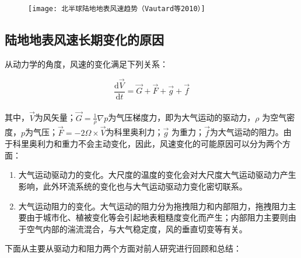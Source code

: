 \begin{figure}[!htbp]
    \centering
    \texttt{[image: 北半球陆地地表风速趋势（Vautard等2010）]}
    \label{fig:NHwindtrendVautard2010}
\end{figure}

\subsection{陆地地表风速长期变化的原因}

从动力学的角度，风速的变化满足下列关系：

\begin{equation} \label{eq:winddynmaic}
\frac{\mathrm{d} \vec{V}}{\mathrm{d} t} = \vec{G} + \vec{F} + \vec{g} + \vec{f}
\end{equation} ~\\
其中，$\vec{V}$为风矢量；$\vec{G} =\frac{1}{\rho} \nabla p $为气压梯度力，即为大气运动的驱动力，$\rho$ 为空气密度，$ p $为气压；$\vec{F} =-2 \Omega \times \vec{V} $为科里奥利力；$\vec{g}$ 为重力；$\vec{f}$为大气运动的阻力。由于科里奥利力和重力不会主动变化，因此，风速变化的可能原因可以分为两个方面：

\begin{enumerate}
 \item 大气运动驱动力的变化。大尺度的温度的变化会对大尺度大气运动驱动力产生影响，此外环流系统的变化也与大气运动驱动力变化密切联系。
 \item 大气运动阻力的变化。大气运动的阻力分为拖拽阻力和内部阻力，拖拽阻力主要由于城市化、植被变化等会引起地表粗糙度变化而产生；内部阻力主要则由于空气内部的湍流混合，与大气稳定度，风的垂直切变等有关。
\end{enumerate}

下面从主要从驱动力和阻力两个方面对前人研究进行回顾和总结：

